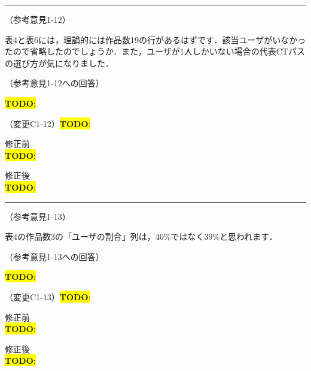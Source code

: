 \documentclass{jarticle} %
\newcommand{\todo}[1]{\colorbox{yellow}{{\bf TODO}:}{\color{blue}{\textbf{[#1]}}}}
\def\subsection#1{ \vspace{1pc} {\gt #1} }
\def\nextans{ \vspace{2pc} \hrule }
\begin{document}
\newpage
\nextans
\subsection{（参考意見1-12）}

表4と表6には，理論的には作品数19の行があるはずです．該当ユーザがいなかったので省略したのでしょうか．また，ユーザが1人しかいない場合の代表CTパスの選び方が気になりました．

\subsection{（参考意見1-12への回答）}

\todo{hoge}

\subsection{（変更C1-12）\todo{hoge}}
\vspace{-0.3cm}
\begin{description}
\item 修正前\\
\phantom{　}
\todo{hoge}
\vspace{-0.3cm}
\item 修正後\\
\phantom{　}
\todo{hoge}
\end{description}


\newpage
\nextans
\subsection{（参考意見1-13）}

表4の作品数3の「ユーザの割合」列は，40\%ではなく39\%と思われます．

\subsection{（参考意見1-13への回答）}

\todo{hoge}

\subsection{（変更C1-13）\todo{hoge}}
\vspace{-0.3cm}
\begin{description}
\item 修正前\\
\phantom{　}
\todo{hoge}
\vspace{-0.3cm}
\item 修正後\\
\phantom{　}
\todo{hoge}
\end{description}
\end{document}
